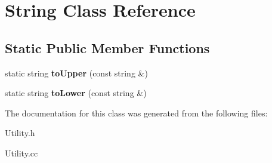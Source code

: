 \hypertarget{classString}{\section{String Class Reference}
\label{classString}
}
\subsection*{Static Public Member Functions}
\begin{DoxyCompactItemize}
\item 
\hypertarget{classString_a52bb84f85b50b36dc4b46a2c05bab951}{static string {\bfseries to\-Upper} (const string \&)}\label{classString_a52bb84f85b50b36dc4b46a2c05bab951}

\item 
\hypertarget{classString_a8fbbe0bb56277d1c80f0b39fff84223f}{static string {\bfseries to\-Lower} (const string \&)}\label{classString_a8fbbe0bb56277d1c80f0b39fff84223f}

\end{DoxyCompactItemize}


The documentation for this class was generated from the following files\-:\begin{DoxyCompactItemize}
\item 
Utility.\-h\item 
Utility.\-cc\end{DoxyCompactItemize}
